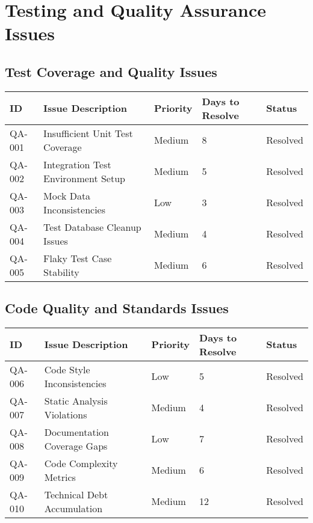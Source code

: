 \documentclass[12pt,a4paper]{article}
\begin{document}
\section{Testing and Quality Assurance Issues}

\subsection{Test Coverage and Quality Issues}

\begin{longtable}{|p{1cm}|p{5cm}|p{2cm}|p{2cm}|p{2cm}|}
\hline
\textbf{ID} & \textbf{Issue Description} & \textbf{Priority} & \textbf{Days to Resolve} & \textbf{Status} \\
\hline
QA-001 & Insufficient Unit Test Coverage & Medium & 8 & \cellcolor{green!30}Resolved \\
\hline
QA-002 & Integration Test Environment Setup & Medium & 5 & \cellcolor{green!30}Resolved \\
\hline
QA-003 & Mock Data Inconsistencies & Low & 3 & \cellcolor{green!30}Resolved \\
\hline
QA-004 & Test Database Cleanup Issues & Medium & 4 & \cellcolor{green!30}Resolved \\
\hline
QA-005 & Flaky Test Case Stability & Medium & 6 & \cellcolor{green!30}Resolved \\
\hline
\end{longtable}

\subsection{Code Quality and Standards Issues}

\begin{longtable}{|p{1cm}|p{5cm}|p{2cm}|p{2cm}|p{2cm}|}
\hline
\textbf{ID} & \textbf{Issue Description} & \textbf{Priority} & \textbf{Days to Resolve} & \textbf{Status} \\
\hline
QA-006 & Code Style Inconsistencies & Low & 5 & \cellcolor{green!30}Resolved \\
\hline
QA-007 & Static Analysis Violations & Medium & 4 & \cellcolor{green!30}Resolved \\
\hline
QA-008 & Documentation Coverage Gaps & Low & 7 & \cellcolor{green!30}Resolved \\
\hline
QA-009 & Code Complexity Metrics & Medium & 6 & \cellcolor{green!30}Resolved \\
\hline
QA-010 & Technical Debt Accumulation & Medium & 12 & \cellcolor{green!30}Resolved \\
\hline
\end{longtable}
\end{document}
